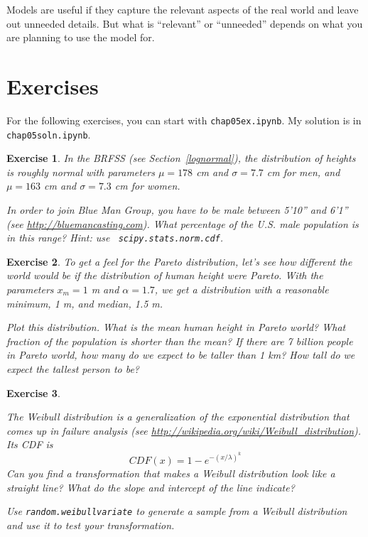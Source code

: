 \documentclass[12pt]{book}
\theoremstyle{exercise}
\newtheorem{exercise}{Exercise}[chapter]
\begin{document}
Models are useful if they capture the relevant aspects of the
real world and leave out unneeded details.  But what is ``relevant''
or ``unneeded'' depends on what you are planning to use the model
for.


\section{Exercises}

For the following exercises, you can start with \verb"chap05ex.ipynb".
My solution is in \verb"chap05soln.ipynb".

\begin{exercise}
In the BRFSS (see Section~\ref{lognormal}), the distribution of
heights is roughly normal with parameters $\mu = 178$ cm and
$\sigma = 7.7$ cm for men, and $\mu = 163$ cm and $\sigma = 7.3$ cm for
women.%
%
%
%
%
%
%

In order to join Blue Man Group, you have to be male between 5'10''
and 6'1'' (see \url{http://bluemancasting.com}).  What percentage of
the U.S. male population is in this range?  Hint: use {\tt
  scipy.stats.norm.cdf}.%

\end{exercise}


\begin{exercise}
To get a feel for the Pareto distribution, let's see how different
the world
would be if the distribution of human height were Pareto.
With the parameters $x_{m} = 1$ m and $\alpha = 1.7$, we
get a distribution with a reasonable minimum, 1 m,
and median, 1.5 m.%
%
%

Plot this distribution.  What is the mean human height in Pareto
world?  What fraction of the population is shorter than the mean?  If
there are 7 billion people in Pareto world, how many do we expect to
be taller than 1 km?  How tall do we expect the tallest person to be?%

\end{exercise}


\begin{exercise}%
\label{weibull}

The Weibull distribution is a generalization of the exponential
distribution that comes up in failure analysis
(see \url{http://wikipedia.org/wiki/Weibull_distribution}).  Its CDF is
%
\[ CDF(x) = 1 - e^{-(x / \lambda)^k} \]
%
Can you find a transformation that makes a Weibull distribution look
like a straight line?  What do the slope and intercept of the
line indicate?%
%
%
%
%

Use {\tt random.weibullvariate} to generate a sample from a
Weibull distribution and use it to test your transformation.

\end{exercise}
\end{document}
